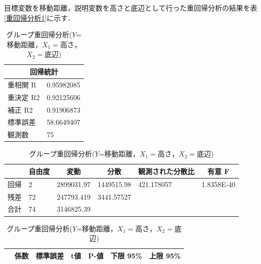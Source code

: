 \documentclass[titlepage,a4paper]{jsarticle}
\begin{document}
目標変数を移動距離，説明変数を高さと底辺として行った重回帰分析の結果を表\ref{重回帰分析1}に示す．
\begin{table}[H]
  \centering
  \caption{グループ重回帰分析($Y$=移動距離，$X_{1}=$高さ，$X_{2}=$底辺)}
  \label{重回帰分析1}
  \begin{minipage}[c]{0.5\hsize}
    \centering
    \label{sub1回帰統計}
    \begin{tabular}{l|l}
      \multicolumn{2}{c}{回帰統計} \\\hline\hline
      重相関 R  & 0.95982085      \\
      重決定 R2 & 0.92125606      \\
      補正 R2  & 0.91906873      \\
      標準誤差   & 58.6649407      \\
      観測数    & 75              \\\hline
    \end{tabular}
  \end{minipage}
  \begin{minipage}[c]{1\hsize}
    \centering
    \label{sub1分析}
    \begin{tabular}{l|lllll}
      \multicolumn{1}{c|}{} & \multicolumn{1}{c}{自由度} & \multicolumn{1}{c}{変動} & \multicolumn{1}{c}{分散} & \multicolumn{1}{c}{観測された分散比} & \multicolumn{1}{c}{有意 F} \\\hline\hline
      回帰                    & 2                       & 2899031.97             & 1449515.98             & 421.178057                   & 1.8358E-40               \\
      残差                    & 72                      & 247793.419             & 3441.57527             &                              &                          \\
      合計                    & 74                      & 3146825.39             &                        &                              &                          \\\hline
    \end{tabular}
  \end{minipage}
  \begin{minipage}[c]{1\hsize}
    \centering
    \label{sub2分析}
    \begin{tabular}{l|llllll}
      \multicolumn{1}{c|}{} & \multicolumn{1}{c}{係数} & \multicolumn{1}{c}{標準誤差} & \multicolumn{1}{c}{t値} & \multicolumn{1}{c}{P-値} & \multicolumn{1}{c}{下限 95\%} & \multicolumn{1}{c}{上限 95\%} \\\hline\hline

\end{tabular}
\end{minipage}
\end{table}
\end{document}
